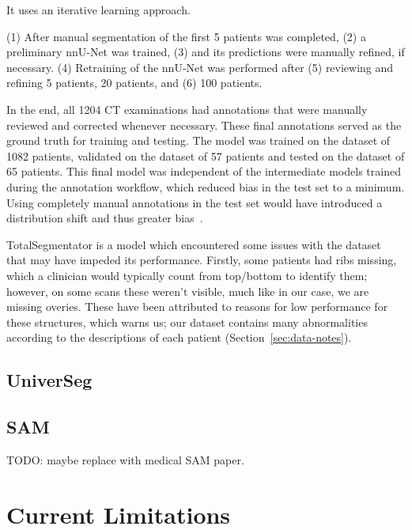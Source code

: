 \documentclass[12pt,twoside]{report}
\begin{document}
It uses an iterative learning approach.

(1) After manual segmentation of the first 5 patients was completed, (2) a preliminary nnU-Net was trained, (3) and its predictions were manually refined, if necessary. (4) Retraining of the nnU-Net was performed after (5) reviewing and refining 5 patients, 20 patients, and (6) 100 patients.

In the end, all 1204 CT examinations had annotations that were manually reviewed and corrected whenever necessary. These final annotations served as the ground truth for training and testing. The model was trained on the dataset of 1082 patients, validated on the dataset of 57 patients and tested on the dataset of 65 patients. This final model was independent of the intermediate models trained during the annotation workflow, which reduced bias in the test set to a minimum. Using completely manual annotations in the test set would have introduced a distribution shift and thus greater bias~\cite{totalsegmentor-paper}.


TotalSegmentator is a model which encountered some issues with the dataset that may have impeded its performance. Firstly, some patients had ribs missing, which a clinician would typically count from top/bottom to identify them; however, on some scans these weren't visible, much like in our case, we are missing overies. These have been attributed to reasons for low performance for these structures, which warns us; our dataset contains many abnormalities according to the descriptions of each patient (Section~\ref{sec:data-notes}).

\subsection{UniverSeg}\label{sect:universeg}



\subsection{SAM}\label{sect:sam}

TODO: maybe replace with medical SAM paper.

\section{Current Limitations}\label{sect:limitations}
\end{document}
